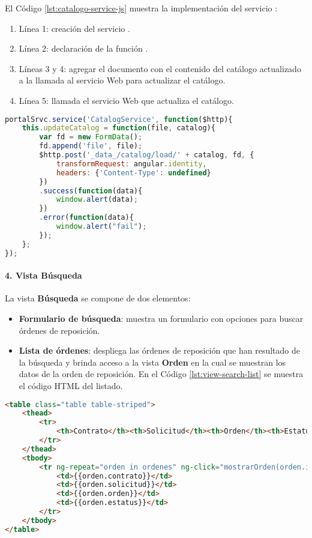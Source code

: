 El Código \ref{lst:catalogo-service-js} muestra la implementación del servicio :
\begin{enumerate}
	\item Línea 1: creación del servicio .
	\item Línea 2: declaración de la función .
	\item Líneas 3 y 4: agregar el documento con el contenido del catálogo actualizado a la llamada al servicio Web para actualizar el catálogo.
	\item Línea 5: llamada el servicio Web que actualiza el catálogo.
\end{enumerate}
\begin{lstlisting}[language=Javascript, caption={Servicio en AngularJS actualizar un catálogo.}, captionpos=b, label={lst:catalogo-service-js}]
portalSrvc.service('CatalogService', function($http){
	this.updateCatalog = function(file, catalog){
		var fd = new FormData();
		fd.append('file', file);
		$http.post('_data_/catalog/load/' + catalog, fd, {
			transformRequest: angular.identity,
			headers: {'Content-Type': undefined}
		})
		.success(function(data){
			window.alert(data);
		})
		.error(function(data){
			window.alert("fail");
		});
    };	
});
\end{lstlisting}

\paragraph{4. Vista Búsqueda\\}
La vista \textbf{Búsqueda} se compone de dos elementos:
\begin{itemize}
	\item \textbf{Formulario de búsqueda}: muestra un formulario con opciones para buscar órdenes de reposición.
	\item \textbf{Lista de órdenes}: despliega las órdenes de reposición que han resultado de la búsqueda y brinda acceso a la vista \textbf{Orden} en la cual se muestran los datos de la orden de reposición. En el Código \ref{lst:view-search-list} se muestra el código HTML del listado.
\end{itemize}

\begin{lstlisting}[language=HTML, captionpos=b, caption={Plantilla que muestra el resultado de la búsqueda de órdenes de reposición.}, label={lst:view-search-list}]
<table class="table table-striped">
	<thead>
		<tr>
			<th>Contrato</th><th>Solicitud</th><th>Orden</th><th>Estatus</th>
		</tr>
	</thead>
	<tbody>
		<tr ng-repeat="orden in ordenes" ng-click="mostrarOrden(orden.id, $event)">
			<td>{{orden.contrato}}</td>
			<td>{{orden.solicitud}}</td>
			<td>{{orden.orden}}</td>
			<td>{{orden.estatus}}</td>
		</tr>
	</tbody>
</table>
\end{lstlisting}

